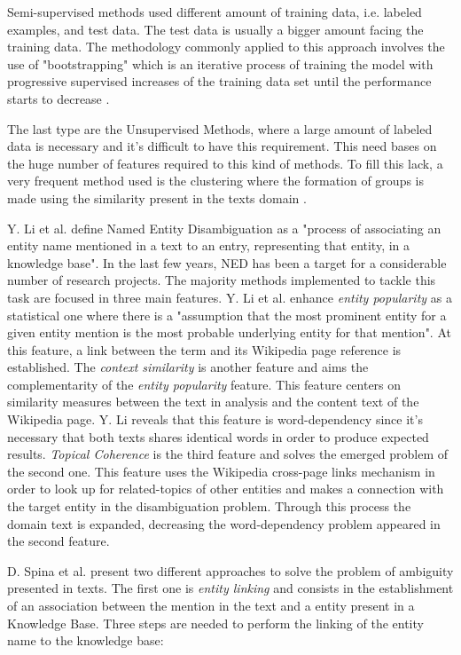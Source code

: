 Semi-supervised methods used different amount of training data, i.e. labeled examples, and test data. The test data is usually a bigger amount facing the training data. The methodology commonly applied to this approach involves the use of "bootstrapping" which is an iterative process of training the model with progressive supervised increases of the training data set until the performance starts to decrease \cite{kn:Irmak2010}.

The last type are the Unsupervised Methods, where a large amount of labeled data is necessary and it's
difficult to have this requirement. This need bases on the huge number of features required to this kind of methods. To fill this lack, a very frequent method used is the clustering where the formation of groups is made using the similarity present in the texts domain \cite{kn:Patawar2015}.

Y. Li et al. \cite{kn:Li2013} define Named Entity Disambiguation as a "process of associating an entity name mentioned in a text to an entry, representing that entity, in a knowledge base". In the last few years, NED has been a target for a considerable number of research projects. The majority methods implemented to tackle this task are focused in three main features. Y. Li et al. \cite{kn:Li2013} enhance \textit{entity popularity} as a statistical one where there is a "assumption that the most prominent entity for a given entity mention is the most probable underlying entity for that mention". At this feature, a link between the term and its Wikipedia page reference is established. The \textit{context similarity} is another feature and aims the complementarity of the \textit{entity popularity} feature. This feature centers on similarity measures between the text in analysis and the content text of the Wikipedia page. Y. Li reveals that this feature is word-dependency since it's necessary that both texts shares identical words in order to produce expected results. \textit{Topical Coherence} is the third feature and solves the emerged problem of the second one. This feature uses the Wikipedia cross-page links mechanism in order to look up for related-topics of other entities and makes a connection with the target entity in the disambiguation problem. Through this process the domain text is expanded, decreasing the word-dependency problem appeared in the second feature.

D. Spina et al. \cite{Spina2013} present two different approaches to solve the problem of ambiguity presented in texts. The first one is \textit{entity linking} and consists in the establishment of an association between the mention in the text and a entity present in a Knowledge Base. Three steps are needed to perform the linking of the entity name to the knowledge base:

